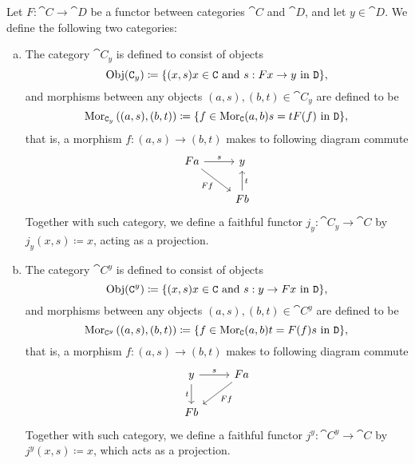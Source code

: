 \begin{definition}
    \label{def:functor-induced-cats}
    Let \(F: \cat C \to \cat D\) be a functor between categories \(\cat C\) and
    \(\cat D\), and let \(y \in \cat D\). We define the following two categories:
    \begin{enumerate}[(a)]\setlength\itemsep{0em}
        \item The category \(\cat C_y\) is defined to consist of objects
              \[
                  \operatorname{Obj}(\texttt C_y) \coloneq
                  \{(x, s) \relax x \in \texttt C \text{ and } s: F x \to y \text{ in } \texttt D\},
              \]
              and morphisms between any objects \((a, s), (b, t) \in \cat C_{y}\) are
              defined to be
              \[
                  \operatorname{Mor}_{\texttt C_y}\left( (a, s), (b, t) \right) \coloneq
                  \{f \in \operatorname{Mor}_{\texttt C}(a, b) \relax s = t F(f) \text{ in } \texttt D\},
              \]
              that is, a morphism \(f: (a, s) \to (b, t)\) makes to following diagram
              commute
              \[
                  \begin{tikzcd}
                      F a \ar[r, "s"] \ar[dr, swap, "Ff"] &y \\
                      &F b \ar[u, swap, "t"]
                  \end{tikzcd}
              \]
              Together with such category, we define a faithful functor \(j_y: \cat C_y \to
              \cat C\) by \(j_y(x, s) \coloneq x\), acting as a projection.
        \item The category \(\cat C^y\) is defined to consist of objects
              \[
                  \operatorname{Obj}(\texttt C^y) \coloneq
                  \{(x, s) \relax x \in \texttt C \text{ and } s: y \to F x \text{ in } \texttt D\},
              \]
              and morphisms between any objects \((a, s), (b, t) \in \cat C^{y}\) are
              defined to be
              \[
                  \operatorname{Mor}_{\texttt C^y}\left( (a, s), (b, t) \right) \coloneq
                  \{f \in \operatorname{Mor}_{\texttt C}(a, b) \relax t = F(f) s \text{ in } \texttt D\},
              \]
              that is, a morphism \(f: (a, s) \to (b, t)\) makes to following diagram
              commute
              \[
                  \begin{tikzcd}
                      y \ar[r, "s"] \ar[d, swap, "t"] &Fa \ar[dl, "F f"] \\
                      F b &
                  \end{tikzcd}
              \]
              Together with such category, we define a faithful functor \(j^y: \cat C^y \to
              \cat C\) by \(j^y(x, s) \coloneq x\), which acts as a projection.
    \end{enumerate}
\end{definition}

